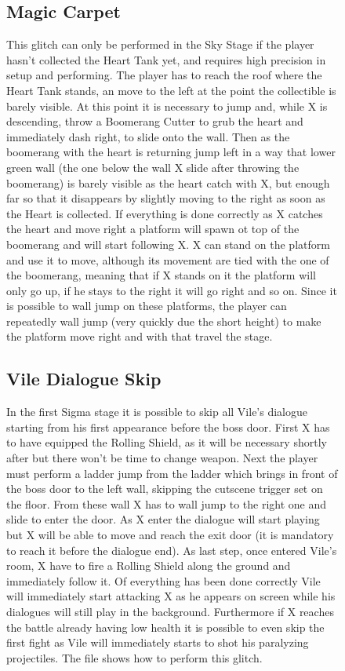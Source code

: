 \begin{figure}[htp]
\subsection{Magic Carpet}
This glitch can only be performed in the Sky Stage if the player hasn't collected the Heart Tank yet, and requires high precision in setup and performing. The player has to reach the roof where the Heart Tank stands, an move to the left at the point the collectible is barely visible. At this point it is necessary to jump and, while X is descending, throw a Boomerang Cutter to grub the heart and immediately dash right, to slide onto the wall. Then as the boomerang with the heart is returning jump left in a way that lower green wall (the one below the wall X slide after throwing the boomerang) is barely visible as the heart catch with X, but enough far so that it disappears by slightly moving to the right as soon as the Heart is collected. If everything is done correctly as X catches the heart and move right a platform will spawn ot top of the boomerang and will start following X. X can stand on the platform and use it to move, although its movement are tied with the one of the boomerang, meaning that if X stands on it the platform will only go up, if he stays to the right it will go right and so on. Since it is possible to wall jump on these platforms, the player can repeatedly wall jump (very quickly due the short height) to make the platform move right and with that travel the stage.

\subsection{Vile Dialogue Skip}
In the first Sigma stage it is possible to skip all Vile's dialogue starting from his first appearance before the boss door. First X has to have equipped the Rolling Shield, as it will be necessary shortly after but there won't be time to change weapon. Next the player must perform a ladder jump from the ladder which brings in front of the boss door to the left wall, skipping the cutscene trigger set on the floor. From these wall X has to wall jump to the right one and slide to enter the door. As X enter the dialogue will start playing but X will be able to move and reach the exit door (it is mandatory to reach it before the dialogue end). As last step, once entered Vile's room, X have to fire a Rolling Shield along the ground and immediately follow it. Of everything has been done correctly Vile will immediately start attacking X as he appears on screen while his dialogues will still play in the background. Furthermore if X reaches the battle already having low health it is possible to even skip the first fight as Vile will immediately starts to shot his paralyzing projectiles. The file  shows how to perform this glitch.


\end{figure}
